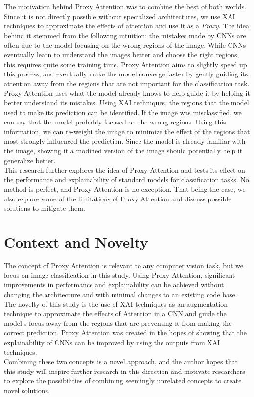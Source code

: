 The motivation behind Proxy Attention was to combine the best of both worlds. Since it is not directly possible without specialized architectures, we use XAI techniques to approximate the effects of attention and use it as a \textit{Proxy}. The idea behind it stemmed from the following intuition: the mistakes made by CNNs are often due to the model focusing on the wrong regions of the image. While CNNs eventually learn to understand the images better and choose the right regions, this requires quite some training time. Proxy Attention aims to slightly speed up this process, and eventually make the model converge faster by gently guiding its attention away from the regions that are not important for the classification task.\\
Proxy Attention uses what the model already knows to help guide it by helping it better understand its mistakes. Using XAI techniques, the regions that the model used to make its prediction can be identified. If the image was misclassified, we can say that the model probably focused on the wrong regions. Using this information, we can re-weight the image to minimize the effect of the regions that most strongly influenced the prediction. Since the model is already familiar with the image, showing it a modified version of the image should potentially help it generalize better.\\
This research further explores the idea of Proxy Attention and tests its effect on the performance and explainability of standard models for classification tasks. No method is perfect, and Proxy Attention is no exception. That being the case, we also explore some of the limitations of Proxy Attention and discuss possible solutions to mitigate them.

\section{Context and Novelty}
The concept of Proxy Attention is relevant to any computer vision task, but we focus on image classification in this study. Using Proxy Attention, significant improvements in performance and explainability can be achieved without changing the architecture and with minimal changes to an existing code base.\\
The novelty of this study is the use of XAI techniques as an augmentation technique to approximate the effects of Attention in a CNN and guide the model's focus away from the regions that are preventing it from making the correct prediction. Proxy Attention was created in the hopes of showing that the explainability of CNNs can be improved by using the outputs from XAI techniques.\\
Combining these two concepts is a novel approach, and the author hopes that this study will inspire further research in this direction and motivate researchers to explore the possibilities of combining seemingly unrelated concepts to create novel solutions.

